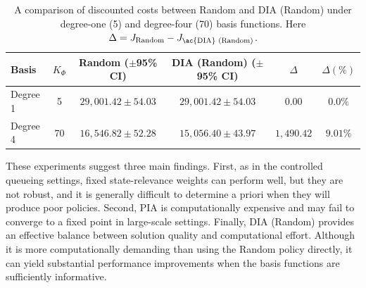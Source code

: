 \documentclass[sglanonrev]{informs4}
\providecommand{\bPhi}{\boldsymbol{\Phi}}
\providecommand{\bc}{\boldsymbol{c}}
\providecommand{\br}{\boldsymbol{r}}
\def\edits#1{{\color{black}#1}}
\begin{document}


\begin{table}[ht]
\centering
\footnotesize
\begin{tabular}{lccccc}
  \toprule
  \textbf{Basis} & \textbf{$K_\Phi$} & \textbf{Random ($\pm$95\% \ac{CI})} & \textbf{\ac{DIA} (Random) ($\pm$95\% \ac{CI})} & \textbf{$\Delta$} & \textbf{$\Delta(\%)$} \\
  \midrule
  Degree 1 & 5 & $29{,}001.42 \pm 54.03$ & $29{,}001.42 \pm 54.03$ & $0.00$ & $0.0\%$ \\
  Degree 4 & 70 & $16{,}546.82 \pm 52.28$ & $15{,}056.40 \pm 43.97$ & $1{,}490.42$ & $9.01\%$ \\
  \bottomrule
\end{tabular}
\caption{A comparison of discounted costs between Random and \ac{DIA} (Random) under degree-one (5) and degree-four (70) basis functions. Here $\Delta = J_{\mathrm{Random}} - J_{\text{\ac{DIA} (Random)}}$. }
\label{tab:scheduling_full_state}
\end{table}

These experiments suggest three main findings. First, as in the controlled queueing settings, fixed state-relevance weights can perform well, but they are not robust, and it is generally difficult to determine a priori when they will produce poor policies. Second, \ac{PIA} is computationally expensive and may fail to converge to a fixed point in large-scale settings. Finally, \ac{DIA} (Random) provides an effective balance between solution quality and computational effort. \edits{Although it is more computationally demanding than using the Random policy directly, it can yield substantial performance improvements when the basis functions are sufficiently informative.}
\end{document}
